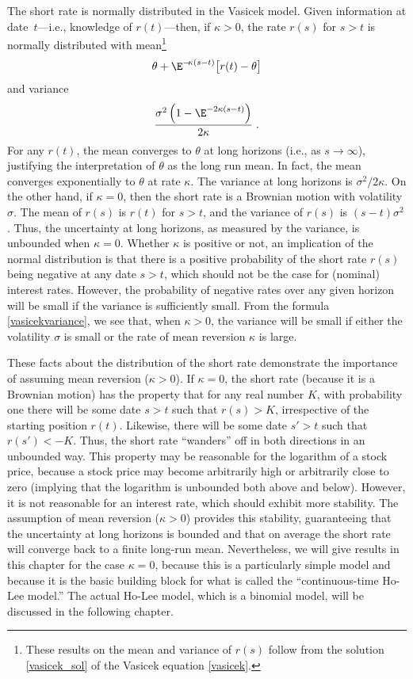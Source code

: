 The short rate is normally distributed in the Vasicek model.  Given information at date~$t$---i.e., knowledge of $r(t)$---then, if $\kappa>0$,
 the rate $r(s)$ for $s>t$ is normally distributed with mean\footnote{These results on the mean and variance of $r(s)$ follow from the solution \eqref{vasicek_sol} of the Vasicek equation \eqref{vasicek}.}
\begin{equation}\label{vasicekmean}
\theta + \E^{-\!\kappa (s-t)}\big[r(t)-\theta\big]
\end{equation}
and variance
\begin{equation}\label{vasicekvariance}
\frac{\sigma^2\left(1-\E^{-2\kappa(s-t)}\right)}{2\kappa}\;.
\end{equation}
For any $r(t)$, the mean converges to $\theta$ at long horizons (i.e., as $s \rightarrow \infty$), justifying the interpretation of $\theta$ as the long run mean.  In fact, the mean converges exponentially to $\theta$ at rate $\kappa$.  The variance at long horizons is $\sigma^2/2\kappa$.  On the other hand, if $\kappa=0$, then the short rate is a Brownian motion with volatility $\sigma$.  The mean of $r(s)$ is $r(t)$ for $s>t$, and the variance of $r(s)$ is $(s-t)\sigma^2$.  Thus, the uncertainty at long horizons, as measured by the variance, is unbounded when $\kappa=0$.  Whether $\kappa$ is positive or not, an implication of the normal distribution is that there is a positive probability of the short rate $r(s)$ being negative at any date $s>t$, which should not be the case for (nominal) interest rates.  However, the probability of negative rates over any given horizon will be small if the variance is sufficiently small.  From the formula \eqref{vasicekvariance}, we see that, when $\kappa>0$, the variance will be small if either the volatility $\sigma$ is small or the rate of mean reversion $\kappa$ is large.

These facts about the distribution of the short rate demonstrate the importance of assuming mean reversion ($\kappa>0$).  If $\kappa=0$, the short rate (because it is a Brownian motion)  has the property that for any real number $K$, with probability one there will be some date $s>t$ such that $r(s)>K$, irrespective of the starting position $r(t)$.  Likewise, there will be some date $s'>t$ such that $r(s')<-K$.  Thus, the short rate ``wanders'' off in both directions in an unbounded way.  This property may be reasonable for the logarithm of a stock price, because a stock price may become arbitrarily high or arbitrarily close to zero (implying that the logarithm is unbounded both above and below).  However, it is not reasonable for an interest rate, which should exhibit more stability.  The assumption of mean reversion ($\kappa>0$) provides this stability, guaranteeing that the uncertainty at long horizons is bounded and that on average the short rate will converge back to a finite long-run mean.  Nevertheless, we will give results in this chapter for the case $\kappa=0$, because this is a particularly simple model and because it is the basic building block for what is called the ``continuous-time Ho-Lee model.''  The actual Ho-Lee model, which is a binomial model, will be discussed in the following chapter.



